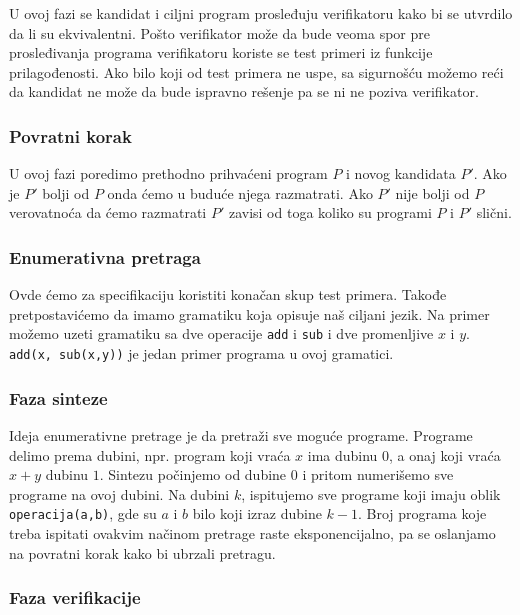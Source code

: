 U ovoj fazi se kandidat i ciljni program prosleđuju verifikatoru kako bi se utvrdilo da li su ekvivalentni. Pošto verifikator može da bude veoma spor pre prosleđivanja programa verifikatoru koriste se test primeri iz funkcije prilagođenosti. Ako bilo koji od test primera ne uspe, sa sigurnošću možemo reći da kandidat ne može da bude ispravno rešenje pa se ni ne poziva verifikator.


\subsubsection*{Povratni korak}

U ovoj fazi poredimo prethodno prihvaćeni program $P$ i novog kandidata $P'$. Ako je $P'$ bolji od $P$ onda ćemo u buduće njega razmatrati. Ako $P'$ nije bolji od $P$ verovatnoća da ćemo razmatrati $P'$ zavisi od toga koliko su programi $P$ i $P'$ slični.


\subsubsection{Enumerativna pretraga}
\label{subsec:EnumerativnaPretragaCegis}

Ovde ćemo za specifikaciju koristiti konačan skup test primera. Takođe pretpostavićemo da imamo gramatiku koja opisuje naš ciljani jezik. Na primer možemo uzeti gramatiku sa dve operacije \texttt{add} i \texttt{sub} i dve promenljive $x$ i $y$. \texttt{add(x, sub(x,y))} je jedan primer programa u ovoj gramatici.


\subsubsection*{Faza sinteze}


Ideja enumerativne pretrage je da pretraži sve moguće programe. Programe delimo prema dubini, npr. program koji vraća $x$ ima dubinu $0$, a onaj koji vraća $x+y$ dubinu $1$.
Sintezu počinjemo od dubine $0$ i pritom numerišemo sve programe na ovoj dubini. Na dubini $k$, ispitujemo sve programe koji imaju oblik \texttt{operacija(a,b)}, gde su $a$ i $b$ bilo koji izraz dubine $k-1$. Broj programa koje treba ispitati ovakvim načinom pretrage raste eksponencijalno, pa se oslanjamo na povratni korak kako bi ubrzali pretragu.


\subsubsection*{Faza verifikacije}


